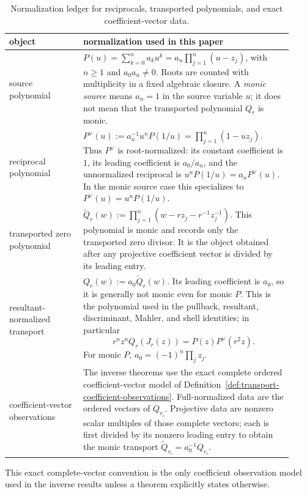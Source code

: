\begin{table}[htbp]
\centering
\small
\renewcommand{\arraystretch}{1.2}
\begin{tabular}{p{0.24\linewidth}|p{0.68\linewidth}}
\hline
object & normalization used in this paper \\
\hline
source polynomial &
\(P(u)=\sum_{k=0}^{n}a_ku^k=a_n\prod_{j=1}^{n}(u-z_j)\), with \(n\ge1\) and \(a_0a_n\ne0\).  Roots are counted with multiplicity in a fixed algebraic closure.  A \emph{monic source} means \(a_n=1\) in the source variable \(u\); it does not mean that the transported polynomial \(Q_r\) is monic. \\
\hline
reciprocal polynomial &
\(P^\vee(u):=a_n^{-1}u^nP(1/u)=\prod_{j=1}^{n}(1-uz_j)\).  Thus \(P^\vee\) is root-normalized: its constant coefficient is \(1\), its leading coefficient is \(a_0/a_n\), and the unnormalized reciprocal is \(u^nP(1/u)=a_nP^\vee(u)\).  In the monic source case this specializes to \(P^\vee(u)=u^nP(1/u)\). \\
\hline
transported zero polynomial &
\(\widetilde Q_r(w):=\prod_{j=1}^{n}(w-rz_j-r^{-1}z_j^{-1})\).  This polynomial is monic and records only the transported zero divisor.  It is the object obtained after any projective coefficient vector is divided by its leading entry. \\
\hline
resultant-normalized transport &
\(Q_r(w):=a_0\widetilde Q_r(w)\).  Its leading coefficient is \(a_0\), so it is generally not monic even for monic \(P\).  This is the polynomial used in the pullback, resultant, discriminant, Mahler, and shell identities; in particular
\[
r^nz^nQ_r(J_r(z))=P(z)P^\vee(r^2z).
\]
For monic \(P\), \(a_0=(-1)^n\prod_jz_j\). \\
\hline
coefficient-vector observations &
The inverse theorems use the exact complete ordered coefficient-vector model of Definition~\ref{def:transport-coefficient-observations}.  Full-normalized data are the ordered vectors of \(Q_{r_i}\).  Projective data are nonzero scalar multiples of those complete vectors; each is first divided by its nonzero leading entry to obtain the monic transport \(\widetilde Q_{r_i}=a_0^{-1}Q_{r_i}\). \\
\hline
\end{tabular}
\caption{Normalization ledger for reciprocals, transported polynomials, and exact coefficient-vector data.}
\label{tab:normalization-ledger}
\end{table}

This exact complete-vector convention is the only coefficient observation model used in the inverse results unless a theorem explicitly states otherwise.

